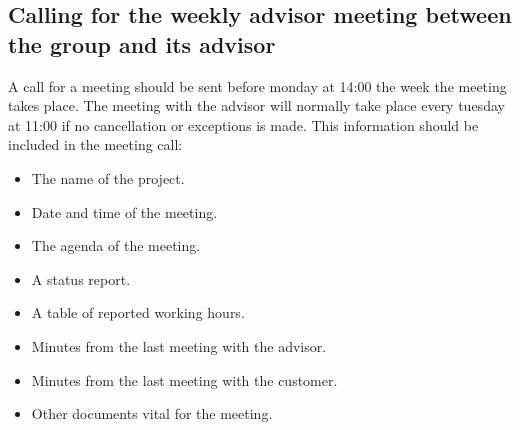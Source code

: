 \subsection{Calling for the weekly advisor meeting between the group and its advisor}
A call for a meeting should be sent before monday at 14:00 the week the meeting takes place. The meeting with the advisor will normally take place every tuesday at 11:00 if no cancellation or exceptions is made.
\newline
\newline
This information should be included in the meeting call:
\begin{itemize}
\item{}The name of the project.
\item{}Date and time of the meeting.
\item{}The agenda of the meeting.
\item{}A status report.
\item{}A table of reported working hours.
\item{}Minutes from the last meeting with the advisor.
\item{}Minutes from the last meeting with the customer.
\item{}Other documents vital for the meeting.
\end{itemize}


